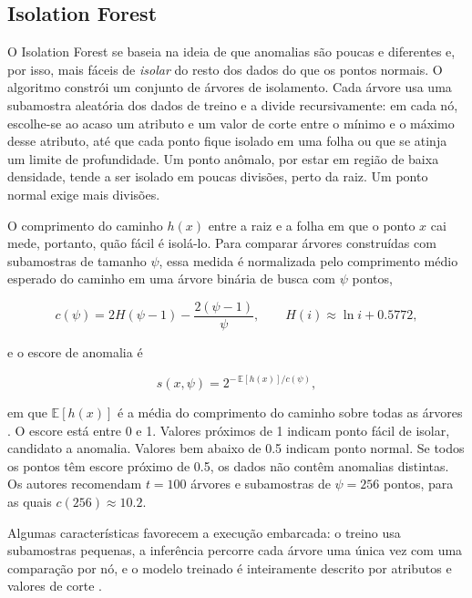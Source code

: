 \subsection{Isolation Forest}
\label{sec:fund-iforest}

O Isolation Forest \cite{liu2008} se baseia na ideia de que anomalias são poucas e diferentes e, por isso, mais fáceis de \emph{isolar} do resto dos dados do
que os pontos normais. O algoritmo constrói um conjunto de árvores de isolamento. Cada árvore usa uma subamostra aleatória dos dados de treino e a divide
recursivamente: em cada nó, escolhe-se ao acaso um atributo e um valor de corte entre o mínimo e o máximo desse atributo, até que cada ponto fique isolado
em uma folha ou que se atinja um limite de profundidade. Um ponto anômalo, por estar em região de baixa densidade, tende a ser isolado em poucas divisões,
perto da raiz. Um ponto normal exige mais divisões.

O comprimento do caminho $h(x)$ entre a raiz e a folha em que o ponto $x$ cai mede, portanto, quão fácil é isolá-lo. Para comparar árvores construídas com
subamostras de tamanho $\psi$, essa medida é normalizada pelo comprimento médio esperado do caminho em uma árvore binária de busca com $\psi$ pontos,

\begin{equation}
c(\psi) = 2H(\psi-1) - \frac{2(\psi-1)}{\psi}, \qquad H(i) \approx \ln i + \num{0,5772},
\label{eq:fund-cn}
\end{equation}

\noindent
e o escore de anomalia é

\begin{equation}
s(x, \psi) = 2^{-\,\mathbb{E}[h(x)] / c(\psi)},
\label{eq:fund-score}
\end{equation}

\noindent
em que $\mathbb{E}[h(x)]$ é a média do comprimento do caminho sobre todas as árvores \cite{liu2008}. O escore está entre 0 e 1. Valores próximos de 1 indicam
ponto fácil de isolar, candidato a anomalia. Valores bem abaixo de \num{0,5} indicam ponto normal. Se todos os pontos têm escore próximo de \num{0,5}, os dados
não contêm anomalias distintas. Os autores recomendam $t = 100$ árvores e subamostras de $\psi = 256$ pontos, para as quais $c(256) \approx \num{10,2}$.

Algumas características favorecem a execução embarcada: o treino usa subamostras pequenas, a inferência percorre cada árvore uma única vez com uma comparação
por nó, e o modelo treinado é inteiramente descrito por atributos e valores de corte \cite{liu2008}.


